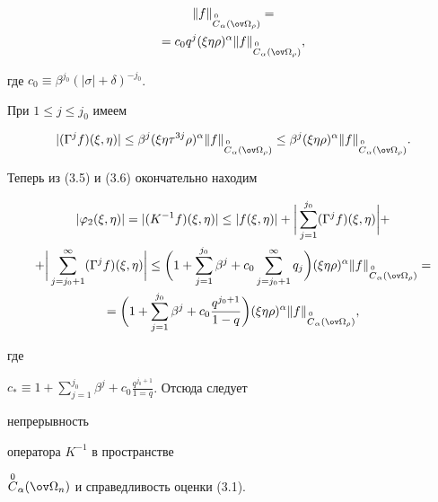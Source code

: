 \begin{pf}
\begin{multline}
\|f\|_{\OC_\alpha(\ov\Omega_\rho)} = \\


%


=c_0 q^j(\xi\eta\rho)^\alpha\|f\|_{\OC_\alpha(\ov\Omega_\rho)},


\end{multline}


где $c_0\equiv\beta^{j_0}(|\sigma|+\delta)^{-j_0}$.





При $1\le j\le j_0$ имеем


\begin{equation}


|(\Gamma^j f)(\xi,\eta)|\le\beta^j(\xi\eta\tau^{3j}\rho)^\alpha


\|f\|_{\OC_\alpha(\ov\Omega_\rho)}\le


\beta^j(\xi\eta\rho)^\alpha\|f\|_{\OC_\alpha(\ov\Omega_\rho)}.


\end{equation}





Теперь из (3.5) и (3.6) окончательно находим


\begin{multline*}


|\varphi_2(\xi,\eta)|=|(K^{-1}f)(\xi,\eta)|\le


|f(\xi,\eta)|+\biggl|\,\sum^{j_0}_{j=1}(\Gamma^j f)(\xi,\eta)


\biggr|+ \\


+\biggl|\,\sum^\infty_{j=j_0+1}(\Gamma^j f)(\xi,\eta)\biggr|\le


\biggl(1+\sum^{j_0}_{j=1}\beta^j+c_0\sum^\infty_{j=j_0+1}


q_j\biggr)(\xi\eta\rho)^\alpha\|f\|_{\OC_\alpha(\ov\Omega_\rho)}= \\


=\biggl(1+\sum^{j_0}_{j=1}\beta^j+c_0


\frac{q^{j_0+1}}{1-q}\biggr)(\xi\eta\rho)^\alpha


\|f\|_{\OC_\alpha(\ov\Omega_\rho)},


\end{multline*}


где


$c_*\equiv1+\sum\limits^{j_0}_{j=1}\beta^j


+c_0\frac{q^{j_0+1}}{1=q}$. Отсюда следует


непрерывность


оператора $K^{-1}$ в пространстве


$\OC_\alpha(\ov\Omega_n)$ и справедливость оценки (3.1).


\end{pf}





